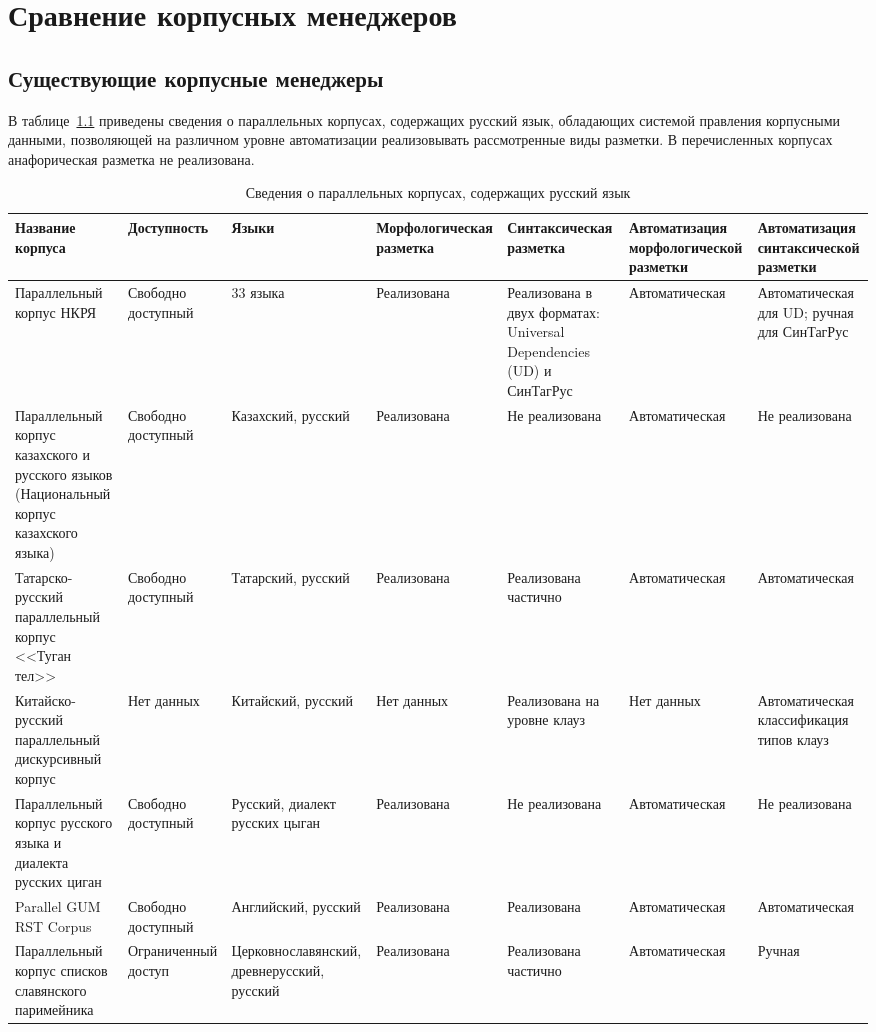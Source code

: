 \chapter{Сравнение корпусных менеджеров}
\section{Существующие корпусные менеджеры}

В таблице~\ref{tab:cdsm} приведены сведения о параллельных корпусах, содержащих русский язык, обладающих системой правления корпусными данными, позволяющей на различном уровне автоматизации реализовывать рассмотренные виды разметки. В перечисленных корпусах анафорическая разметка не реализована.

\begin{table}
	\centering
	\caption{Сведения о параллельных корпусах, содержащих русский язык}
	\begin{tabular}{|p{}|p{}|p{}|p{}|p{}|p{}|p{}|}
		\hline
		Название корпуса & Доступность & Языки & Морфологическая разметка & Синтаксическая разметка & Автоматизация морфологической разметки & Автоматизация синтаксической разметки\\\hline
		Параллельный корпус НКРЯ~\cite{ruscorpora} & Свободно доступный & 33 языка & Реализована & Реализована в двух форматах: Universal Dependencies (UD) и СинТагРус & Автоматическая & Автоматическая для UD; ручная для СинТагРус\\\hline
		Параллельный корпус казахского и русского языков (Национальный корпус казахского языка)~\cite{ashimbayeva_2023} & Свободно доступный & Казахский, русский &  Реализована & Не реализована & Автоматическая & Не реализована\\\hline
		Татарско-русский параллельный корпус <<Туган тел>>~\cite{tugantel_parallel}& Свободно доступный & Татарский, русский & Реализована & Реализована \nohyphens{частично} & Автоматическая & Автоматическая\\\hline
		Китайско-русский параллельный дискурсивный корпус~\cite{yang_2018} & Нет данных & Китайский, русский & Нет данных & Реализована на уровне клауз &
		Нет данных & Автоматическая классификация типов клауз\\\hline
		Параллельный корпус русского языка и диалекта русских циган~\cite{lyashevskaya_etal_2024} & Свободно доступный & Русский, диалект русских цыган & Реализована & Не реализована & Автоматическая & Не реализована\\\hline
		Parallel GUM RST Corpus~\cite{chistova_2024} & Свободно доступный & 	Английский, русский & Реализована & Реализована & Автоматическая & Автоматическая\\\hline
		Параллельный корпус списков славянского паримейника & Ограниченный доступ & Церковно\-славянский, древнерусский, русский & Реализована & Реализована \nohyphens{частично} & Автоматическая & Ручная\\\hline
	\end{tabular}
	\label{tab:cdsm}
\end{table}

